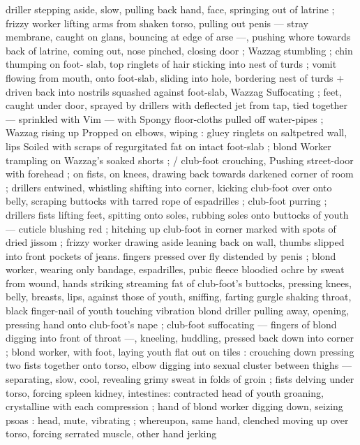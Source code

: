 {driller stepping aside, slow, pulling back hand, face, springing out of 
latrine ; frizzy worker lifting arms from shaken torso, pulling out 
penis --- stray membrane, caught on glans, bouncing at edge of arse 
---, pushing whore towards back of latrine, coming out, nose 
pinched, closing door ; Wazzag stumbling ; chin thumping on foot- 
slab, top ringlets of hair sticking into nest of turds ; vomit flowing 
from mouth, onto foot-slab, sliding into hole, bordering nest of turds 
+ driven back into nostrils squashed against foot-slab, Wazzag 
Suffocating ; feet, caught under door, sprayed by drillers with 
deflected jet from tap, tied together --- sprinkled with Vim --- with 
Spongy floor-cloths pulled off water-pipes ; Wazzag rising up 
Propped on elbows, wiping : gluey ringlets on saltpetred wall, lips 
Soiled with scraps of regurgitated fat on intact foot-slab ; blond 
Worker trampling on Wazzag's soaked shorts ; {\slash} club-foot crouching, 
Pushing street-door with forehead ; on fists, on knees, drawing back 
towards darkened corner of room ; drillers entwined, whistling 
shifting into corner, kicking club-foot over onto belly, scraping 
buttocks with tarred rope of espadrilles ; club-foot purring ; drillers 
fists lifting feet, spitting onto soles, rubbing soles onto buttocks of 
youth --- cuticle blushing red ; hitching up club-foot in corner 
marked with spots of dried jissom ; frizzy worker drawing aside 
leaning back on wall, thumbs slipped into front pockets of jeans. 
fingers pressed over fly distended by penis ; blond worker, wearing 
only bandage, espadrilles, pubic fleece bloodied ochre by sweat from 
wound, hands striking streaming fat of club-foot's buttocks, pressing 
knees, belly, breasts, lips, against those of youth, sniffing, farting 
gurgle shaking throat, black finger-nail of youth touching vibration 
blond driller pulling away, opening, pressing hand onto club-foot's 
nape ; club-foot suffocating --- fingers of blond digging into front of 
throat ---, kneeling, huddling, pressed back down into corner ; blond 
worker, with foot, laying youth flat out on tiles : crouching down 
pressing two fists together onto torso, elbow digging into sexual 
cluster between thighs --- separating, slow, cool, revealing grimy 
sweat in folds of groin ; fists delving under torso, forcing spleen 
kidney, intestines: contracted head of youth groaning, crystalline 
with each compression ; hand of blond worker digging down, seizing 
psoas : head, mute, vibrating ; whereupon, same hand, clenched 
moving up over torso, forcing serrated muscle, other hand jerking 
}
